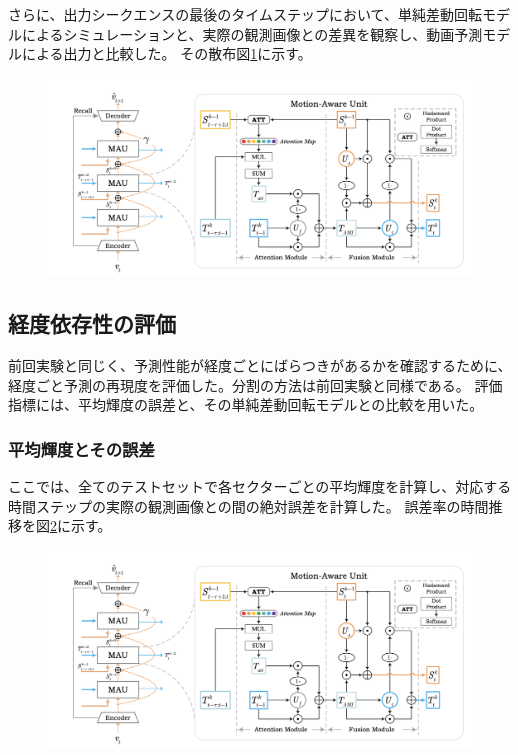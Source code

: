         さらに、出力シークエンスの最後のタイムステップにおいて、単純差動回転モデルによるシミュレーションと、実際の観測画像との差異を観察し、動画予測モデルによる出力と比較した。
        その散布図\ref{fig:exp2_sdr_scatter}に示す。
        
        \begin{figure}[h]
          \centering
          \includegraphics[width=\textwidth]{figures/mau.png}
          \caption{}
          \label{fig:exp2_sdr_scatter}
        \end{figure}
        
      \subsection{経度依存性の評価}
        前回実験と同じく、予測性能が経度ごとにばらつきがあるかを確認するために、経度ごと予測の再現度を評価した。分割の方法は前回実験と同様である。
        評価指標には、平均輝度の誤差と、その単純差動回転モデルとの比較を用いた。

        \subsubsection{平均輝度とその誤差}
          ここでは、全てのテストセットで各セクターごとの平均輝度を計算し、対応する時間ステップの実際の観測画像との間の絶対誤差を計算した。
          誤差率の時間推移を図\ref{fig:exp2_mean_intensity_longitude_line}に示す。
          \begin{figure}[h]
            \centering
            \includegraphics[width=\textwidth]{figures/mau.png}
            \caption{}
            \label{fig:exp2_mean_intensity_longitude_line}
          \end{figure}
          
